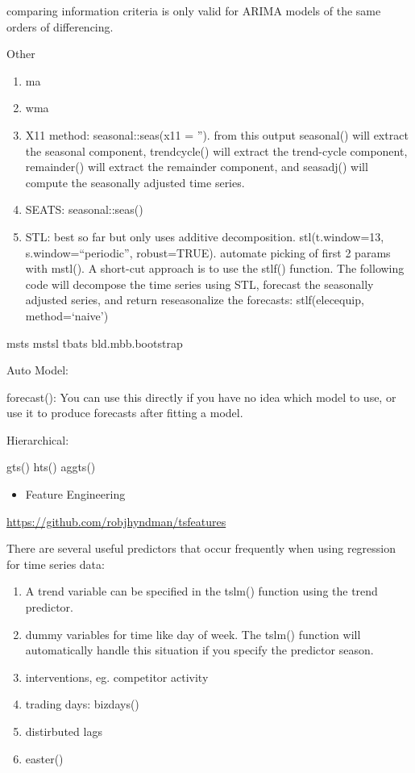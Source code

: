 \documentclass[]{book}
\providecommand{\tightlist}{%
  \setlength{\itemsep}{0pt}\setlength{\parskip}{0pt}}
\theoremstyle{definition}
\theoremstyle{definition}
\theoremstyle{definition}
\theoremstyle{remark}
\begin{document}
comparing information criteria is only valid for ARIMA models of the
same orders of differencing.

Other

\begin{enumerate}
\def\labelenumi{\arabic{enumi}.}
\item
  ma
\item
  wma
\item
  X11 method: seasonal::seas(x11 = ''). from this output seasonal() will
  extract the seasonal component, trendcycle() will extract the
  trend-cycle component, remainder() will extract the remainder
  component, and seasadj() will compute the seasonally adjusted time
  series.
\item
  SEATS: seasonal::seas()
\item
  STL: best so far but only uses additive decomposition.
  stl(t.window=13, s.window=``periodic'', robust=TRUE). automate picking
  of first 2 params with mstl(). A short-cut approach is to use the
  stlf() function. The following code will decompose the time series
  using STL, forecast the seasonally adjusted series, and return
  reseasonalize the forecasts: stlf(elecequip, method=`naive')
\end{enumerate}

msts \textbar{} mstsl \textbar{} tbats \textbar{} bld.mbb.bootstrap

Auto Model:

forecast(): You can use this directly if you have no idea which model to
use, or use it to produce forecasts after fitting a model.

Hierarchical:

gts() \textbar{} hts() \textbar{} aggts()

\begin{itemize}
\tightlist
\item
  Feature Engineering
\end{itemize}

\url{https://github.com/robjhyndman/tsfeatures}

There are several useful predictors that occur frequently when using
regression for time series data:

\begin{enumerate}
\def\labelenumi{\arabic{enumi})}
\item
  A trend variable can be specified in the tslm() function using the
  trend predictor.
\item
  dummy variables for time like day of week. The tslm() function will
  automatically handle this situation if you specify the predictor
  season.
\item
  interventions, eg. competitor activity
\item
  trading days: bizdays()
\item
  distirbuted lags
\item
  easter()
\end{enumerate}
\end{document}
